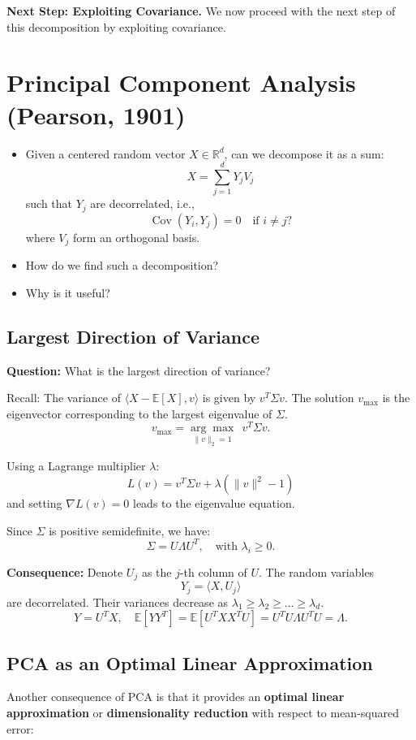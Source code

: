 \documentclass{article}
\begin{document}
\textbf{Next Step: Exploiting Covariance.}
We now proceed with the next step of this decomposition by exploiting covariance.

\section{Principal Component Analysis (Pearson, 1901)}
\begin{itemize}
    \item Given a centered random vector \( X \in \mathbb{R}^d \), can we decompose it as a sum:
    \[
    X = \sum_{j=1}^{d} Y_j V_j
    \]
    such that \( Y_j \) are decorrelated, i.e.,
    \[
    \operatorname{Cov}(Y_i, Y_j) = 0 \quad \text{if } i \neq j?
    \]
    where \( V_j \) form an orthogonal basis.
    
    \item How do we find such a decomposition?
    \item Why is it useful?
\end{itemize}



\subsection{Largest Direction of Variance}
\textbf{Question:} What is the largest direction of variance?

Recall: The variance of \( \langle X - \mathbb{E}[X], v \rangle \) is given by $
    v^T \Sigma v$. The solution \( v_{\max} \) is the eigenvector corresponding to the largest eigenvalue of \( \Sigma \).
    \[
    v_{\max} = \underset{\| v \|_2 = 1}{\arg\max}\ \  v^T \Sigma v.
    \]
    
Using a Lagrange multiplier \( \lambda \):
    \[
    L(v) = v^T \Sigma v + \lambda (\| v \|^2 - 1)
    \]
    and setting \( \nabla L(v) = 0 \) leads to the eigenvalue equation.

Since \( \Sigma \) is positive semidefinite, we have:
\[
\Sigma = U \Lambda U^T, \quad \text{with } \lambda_i \geq 0.
\]

\textbf{Consequence:}
Denote \( U_j \) as the \( j \)-th column of \( U \). The random variables
    \[
    Y_j = \langle X, U_j \rangle
    \]
    are decorrelated. Their variances decrease as
    $
    \lambda_1 \geq \lambda_2 \geq \dots \geq \lambda_d.
    $
\[
Y = U^T X, \quad \mathbb{E}[Y Y^T] = \mathbb{E}[U^T X X^T U] = U^T U \Lambda U^T U = \Lambda.
\]



\subsection{PCA as an Optimal Linear Approximation}
Another consequence of PCA is that it provides an \textbf{optimal linear approximation} or \textbf{dimensionality reduction} with respect to mean-squared error:
\end{document}
